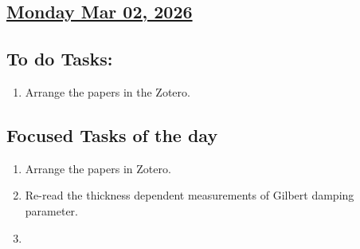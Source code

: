\subsection*{\underline{Monday Mar 02, 2026}}
\subsection*{To do Tasks:}
\begin{enumerate}
    \item Arrange the papers in the Zotero.
\end{enumerate}
\subsection*{Focused Tasks of the day}
\begin{enumerate}[\ding{212}]  
        \item Arrange the papers in Zotero.
    \item Re-read the thickness dependent measurements of Gilbert damping parameter.
    \item 
\end{enumerate}
